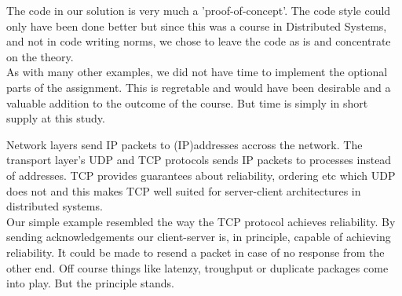 The code in our solution is very much a 'proof-of-concept'. The code style could only have been done better but since this was a course in Distributed Systems, and not in code writing norms, we chose to leave the code as is and concentrate on the theory.  \\

As with many other examples, we did not have time to implement the optional parts of the assignment. This is regretable and would have been desirable and a valuable addition to the outcome of the course. But time is simply in short supply at this study.\\

Network layers send IP packets to (IP)addresses accross the network. The transport layer's UDP and TCP protocols sends IP packets to processes instead of addresses. TCP provides guarantees about reliability, ordering etc which UDP does not and this makes TCP well suited for server-client architectures in distributed systems. \\

Our simple example resembled the way the TCP protocol achieves reliability. By sending acknowledgements our client-server is, in principle, capable of achieving reliability. It could be made to resend a packet in case of no response from the other end. Off course things like latenzy, troughput or duplicate packages come into play. But the principle stands.     


